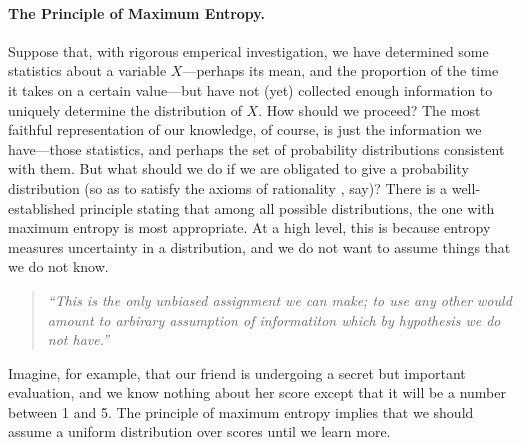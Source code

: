 \paragraph{The Principle of Maximum Entropy.}
    \label{sec:prelim-maxent}
%
Suppose that, with rigorous emperical investigation, we have determined some statistics about a variable $X$---perhaps its mean, and the proportion of the time it takes on a certain value---but have not (yet) collected enough information to uniquely determine the distribution of $X$. 
How should we proceed?
The most faithful representation of our knowledge, of course, is just the information we have---those statistics, and perhaps the set of probability distributions consistent with them. 
But what should we do if we are obligated to give a probability distribution 
    (so as to satisfy the axioms of rationality \citep{sep-dutch-book,halpern-RAU}, say)?
There is a well-established principle stating that among all possible distributions, the one with maximum entropy is most appropriate. 
%
At a high level, this is because 
    entropy measures uncertainty in a distribution, and we do not want to assume things that we do not know.
\begin{quotation}
    \it\singlespacingplus
    ``This is the only unbiased assignment we can make; to use any other would amount to arbirary assumption of informatiton which by hypothesis we do not have.'' 
        \citep[p.623]{jaynes1957information}
\end{quotation}
Imagine, for example, that our friend is undergoing a secret but important evaluation, 
and we know nothing about her score except that it will be a number between 1 and 5.
%
The principle of maximum entropy implies that we should assume a uniform distribution over scores until we learn more.  

